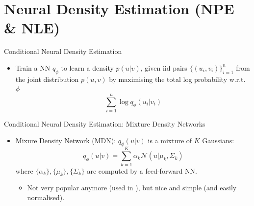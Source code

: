 \documentclass[12pt, aspectratio=169]{beamer}
\let\olditem\item
\renewcommand\item{\olditem\justifying}
\begin{document}
\section{Neural Density Estimation (NPE \& NLE)}
\begin{frame}{Conditional Neural Density Estimation}
    \begin{itemize}[<+->]

        \item Train a NN $q_\phi$ to learn a density $p(u|v)$, given iid pairs $\{(u_i,v_i)\}_{i=1}^n$ from the joint distribution $p(u,v)$ by maximising the total log probability w.r.t. $\phi$
        $$\sum_{i=1}^n \log q_\phi(u_i|v_i)$$

    \end{itemize}
\end{frame}

\begin{frame}{Conditional Neural Density Estimation: Mixture Density Networks}
    \begin{itemize}[<+->]

        \item Mixure Density Network (MDN): $q_\phi(u|v)$ is a mixture of $K$ Gaussians:
        $$q_\phi(u|v) = \sum_{k=1}^K \alpha_k \mathcal{N}(u | \mu_k, \Sigma_k)$$
        where $\{\alpha_k\}, \{\mu_k\}, \{\Sigma_k\}$ are computed by a feed-forward NN.
        \begin{itemize}
            \item Not very popular anymore (used in \cite{papamakarios_fast_2018}), but nice and simple (and easily normalised).
        \end{itemize}
        
    \end{itemize}
\end{frame}
\end{document}
